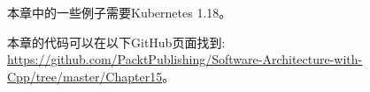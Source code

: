 本章中的一些例子需要Kubernetes 1.18。

本章的代码可以在以下GitHub页面找到: \url{ https://github.com/PacktPublishing/Software-Architecture-with-Cpp/tree/master/Chapter15}。